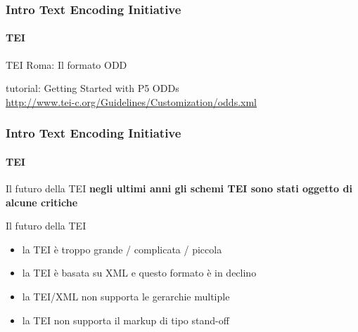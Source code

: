 


\begin{frame}
	\frametitle{Intro Text Encoding Initiative}
	\framesubtitle{TEI}
	\addtocounter{nframe}{1}

	\begin{block}{TEI Roma: Il formato ODD}

		tutorial: Getting Started with P5 ODDs\\
		\url{http://www.tei-c.org/Guidelines/Customization/odds.xml}

	\end{block}


\end{frame}






\begin{frame}
	\frametitle{Intro Text Encoding Initiative}
	\framesubtitle{TEI}
	\addtocounter{nframe}{1}

	\begin{block}{Il futuro della TEI}
		\textbf{negli ultimi anni gli schemi TEI sono stati oggetto di alcune critiche}
	\end{block}

	\begin{block}{Il futuro della TEI}
		\begin{itemize}
			\item la TEI è troppo grande / complicata / piccola
			\item la TEI è basata su XML e questo formato è in declino
			\item la TEI/XML non supporta le gerarchie multiple
			\item la TEI non supporta il markup di tipo stand-off
		\end{itemize}
	\end{block}

\end{frame}


